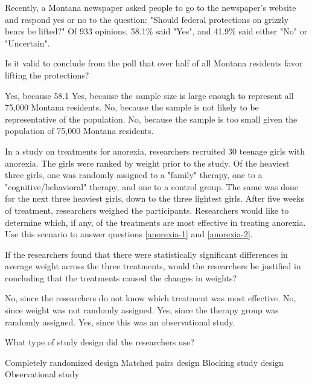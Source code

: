 \documentclass{article}
\begin{document}
\begin{mcquestions}
		\begin{mcquestioninstruction}
			Recently, a Montana newspaper asked people to go to the newspaper's website and respond yes or no to the question: "Should federal protections on grizzly bears be lifted?" Of 933 opinions, 58.1\% said "Yes", and 41.9\% said either "No" or "Uncertain".
		\end{mcquestioninstruction}
		\question Is it valid to conclude from the poll that over half of all Montana residents favor lifting the protections?
		\begin{mcanswerslist}
			\answer Yes, because 58.1%
			\answer Yes, because the sample size is large enough to represent all 75,000 Montana residents.
			\answer[correct] No, because the sample is not likely to be representative of the population.
			\answer No, because the sample is too small given the population of 75,000 Montana residents.
		\end{mcanswerslist}
		
		\begin{mcquestioninstruction}
			In a study on treatments for anorexia, researchers recruited 30 teenage girls with anorexia. The girls were ranked by weight prior to the study. Of the heaviest three girls, one was randomly assigned to a "family" therapy, one to a "cognitive/behavioral" therapy, and one to a control group. The same was done for the next three heaviest girls, down to the three lightest girls. After five weeks of treatment, researchers weighed the participants. Researchers would like to determine which, if any, of the treatments are most effective in treating anorexia. Use this scenario to answer questions \ref{anorexia-1} and \ref{anorexia-2}.
		\end{mcquestioninstruction}
		\question  If the researchers found that there were statistically significant differences in average weight across the three treatments, would the researchers be justified in concluding that the treatments caused the changes in weights? \label{anorexia-1}
		\begin{mcanswerslist}
			\answer No, since the researchers do not know which treatment was most effective.
			\answer No, since weight was not randomly assigned.
			\answer[correct] Yes, since the therapy group was randomly assigned.
			\answer Yes, since this was an observational study.
		\end{mcanswerslist}
		
		\question[follow]  What type of study design did the researchers use? \label{anorexia-2}
		\begin{mcanswerslist}
			\answer Completely randomized design
			\answer Matched pairs design
			\answer[correct] Blocking study design
			\answer Observational study
		\end{mcanswerslist}
		

\end{mcquestions}
\end{document}
